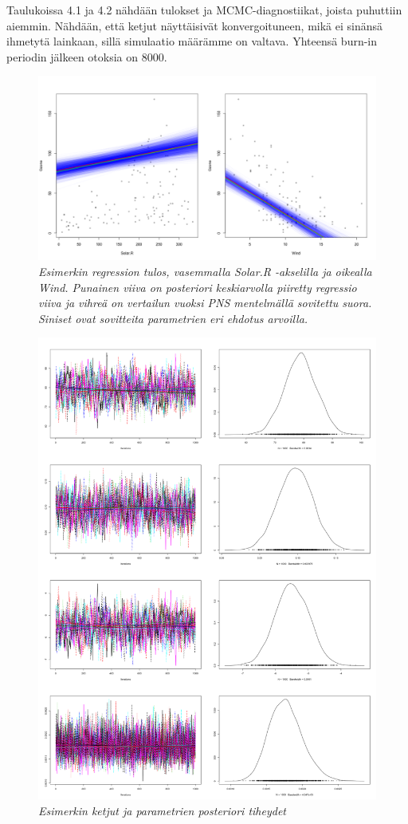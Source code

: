 Taulukoissa 4.1 ja 4.2 nähdään tulokset ja MCMC-diagnostiikat, joista puhuttiin aiemmin. Nähdään, että ketjut näyttäisivät konvergoituneen, mikä ei sinänsä ihmetytä lainkaan, sillä simulaatio määrämme on valtava. Yhteensä burn-in periodin jälkeen otoksia on 8000.
\begin{figure}[h!]
	\includegraphics[width=\textwidth]{gibbsexample}
	\caption[Regressio]{\textit{Esimerkin regression tulos, vasemmalla Solar.R -akselilla ja oikealla Wind. Punainen viiva on posteriori keskiarvolla piiretty regressio viiva ja vihreä on vertailun vuoksi PNS mentelmällä sovitettu suora. Siniset ovat sovitteita parametrien eri ehdotus arvoilla.}}
	\label{kuva1}
\end{figure}

\begin{figure}[h!]
	\includegraphics[width=\textwidth]{gibbs2}
	\caption[]{\textit{Esimerkin ketjut ja parametrien posteriori tiheydet}}
	\label{kuva1}
\end{figure}



